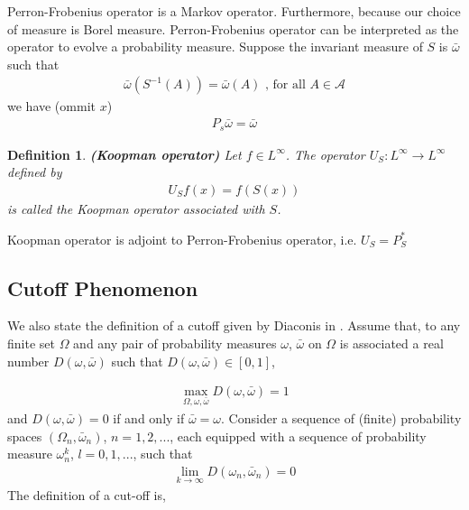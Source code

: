 \documentclass{article}
\newtheorem{definition}{Definition}
\begin{document}
Perron-Frobenius operator is a Markov operator. Furthermore, because our choice of measure is Borel measure. Perron-Frobenius operator can be interpreted as the operator to evolve a probability measure. Suppose the invariant measure of $S$ is $\bar{\omega}$  such that 
\begin{eqnarray}
   \bar{\omega}(S^{-1}(A)) = \bar{\omega}(A)  \mbox{    , for all } A \in \mathcal{A} 
\end{eqnarray}
we have (ommit $x$)
\begin{eqnarray}
  P_s\bar{\omega} = \bar{\omega}
\end{eqnarray}

\begin{definition} {\bfseries (Koopman operator)}
Let $f \in L^\infty$. The operator $U_S:L^{\infty} \rightarrow L^{\infty} $ defined by 
 \begin{eqnarray}
 U_Sf(x) = f(S(x)) 
 \end{eqnarray}
is called the Koopman operator associated with $S$.
\end{definition} 

Koopman operator is adjoint to Perron-Frobenius operator, i.e. $U_S = P_S^*$ 






\subsection{Cutoff Phenomenon}
We also state the definition of a cutoff given by Diaconis in
\cite{Diaconis2005}. Assume that, to any finite set $\Omega$ and any
pair of probability measures $\omega$, $\bar{\omega}$ on $\Omega$ is associated
a real number $D(\omega,\bar{\omega})$ such that $D(\omega,\bar{\omega})\in [0,1]$,

\begin{eqnarray}
\max_{\Omega,\omega,\bar{\omega}} D(\omega,\bar{\omega}) = 1
\end{eqnarray}
and $D(\omega,\bar{\omega})=0$ if and only if $\bar{\omega}=\omega$. Consider a sequence of
(finite) probability spaces $(\Omega_n,\bar{\omega}_n)$, $n=1,2,...$, each
equipped with a sequence of probability measure $\omega^k_n$,
$l=0,1,...$, such that
\begin{eqnarray}
\lim_{k \rightarrow \infty} D(\omega_n,\bar{\omega}_n)=0
\end{eqnarray}
The definition of a cut-off is,
\end{document}
